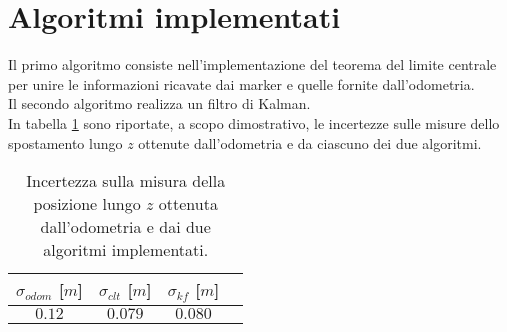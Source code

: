 \documentclass[
	a4paper, %
	10pt, %
]{LTJournalArticle}
\begin{document}
\section{Algoritmi implementati}

Il primo algoritmo consiste nell'implementazione del teorema del limite centrale per unire le informazioni ricavate dai marker e quelle fornite dall'odometria.\\
Il secondo algoritmo realizza un filtro di Kalman.\\
In tabella \ref{tab:finaluncertainties} sono riportate, a scopo dimostrativo, le incertezze sulle misure dello spostamento lungo $z$ ottenute dall'odometria e da ciascuno dei due algoritmi.
\begin{table}[h]
    \centering
    \begin{tabular}{|c |c| c| c|}
    \hline
       $\sigma_{odom}$ [$m$] & $\sigma_{clt}$ [$m$] & $\sigma_{kf}$ [$m$] \\
       \hline
        $0.12$ & $0.079$ &  $0.080 $\\
        \hline
    \end{tabular}
    \caption{Incertezza sulla misura della posizione lungo $z$ ottenuta dall'odometria e dai due algoritmi implementati.}
    \label{tab:finaluncertainties}
\end{table}

\printbibliography %

\end{document}
